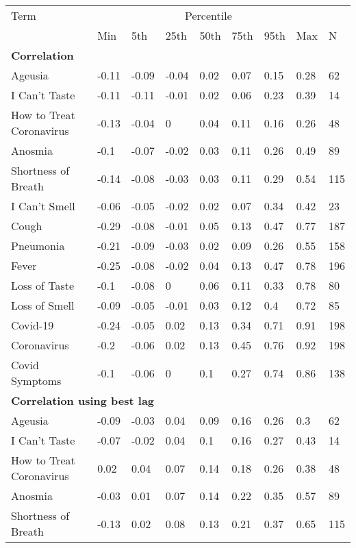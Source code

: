\begin{tabular}{l llllllll} 
\hline 
Term & & \multicolumn{5}{c}{Percentile} &  &  \\ 
 & Min & 5th & 25th & 50th & 75th & 95th & Max & N \\ 
\hline 
\multicolumn{9}{l}{{\bf Correlation}} \\ 
Ageusia & -0.11 & -0.09 & -0.04 & 0.02 & 0.07 & 0.15 & 0.28 & 62  \\ 
I Can't Taste & -0.11 & -0.11 & -0.01 & 0.02 & 0.06 & 0.23 & 0.39 & 14  \\ 
How to Treat Coronavirus & -0.13 & -0.04 & 0 & 0.04 & 0.11 & 0.16 & 0.26 & 48  \\ 
Anosmia & -0.1 & -0.07 & -0.02 & 0.03 & 0.11 & 0.26 & 0.49 & 89  \\ 
Shortness of Breath & -0.14 & -0.08 & -0.03 & 0.03 & 0.11 & 0.29 & 0.54 & 115  \\ 
I Can't Smell & -0.06 & -0.05 & -0.02 & 0.02 & 0.07 & 0.34 & 0.42 & 23  \\ 
Cough & -0.29 & -0.08 & -0.01 & 0.05 & 0.13 & 0.47 & 0.77 & 187  \\ 
Pneumonia & -0.21 & -0.09 & -0.03 & 0.02 & 0.09 & 0.26 & 0.55 & 158  \\ 
Fever & -0.25 & -0.08 & -0.02 & 0.04 & 0.13 & 0.47 & 0.78 & 196  \\ 
Loss of Taste & -0.1 & -0.08 & 0 & 0.06 & 0.11 & 0.33 & 0.78 & 80  \\ 
Loss of Smell & -0.09 & -0.05 & -0.01 & 0.03 & 0.12 & 0.4 & 0.72 & 85  \\ 
Covid-19 & -0.24 & -0.05 & 0.02 & 0.13 & 0.34 & 0.71 & 0.91 & 198  \\ 
Coronavirus & -0.2 & -0.06 & 0.02 & 0.13 & 0.45 & 0.76 & 0.92 & 198  \\ 
Covid Symptoms & -0.1 & -0.06 & 0 & 0.1 & 0.27 & 0.74 & 0.86 & 138  \\ 
\hline 
\multicolumn{9}{l}{{\bf Correlation using best lag}}  \\ 
Ageusia & -0.09 & -0.03 & 0.04 & 0.09 & 0.16 & 0.26 & 0.3 & 62  \\ 
I Can't Taste & -0.07 & -0.02 & 0.04 & 0.1 & 0.16 & 0.27 & 0.43 & 14  \\ 
How to Treat Coronavirus & 0.02 & 0.04 & 0.07 & 0.14 & 0.18 & 0.26 & 0.38 & 48  \\ 
Anosmia & -0.03 & 0.01 & 0.07 & 0.14 & 0.22 & 0.35 & 0.57 & 89  \\ 
Shortness of Breath & -0.13 & 0.02 & 0.08 & 0.13 & 0.21 & 0.37 & 0.65 & 115  \\ 

\end{tabular}
